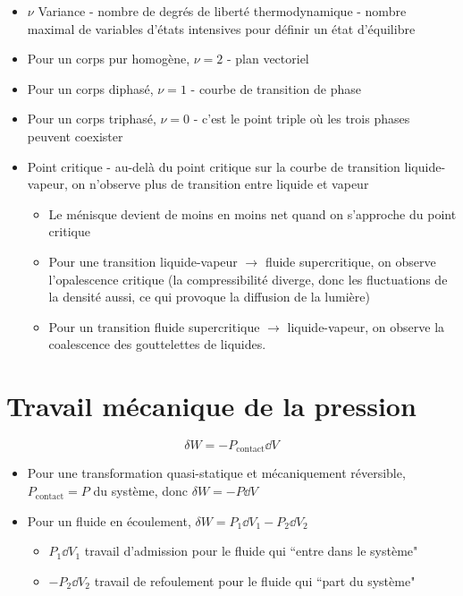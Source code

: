 \documentclass[openany]{book}
\begin{document}
\begin{itemize}
    \item $\nu$ Variance - nombre de degrés de liberté thermodynamique - nombre maximal de variables d'états intensives pour définir un état d'équilibre
    \item Pour un corps pur homogène, $\nu = 2$ - plan vectoriel
    \item Pour un corps diphasé, $\nu = 1$ - courbe de transition de phase
    \item Pour un corps triphasé, $\nu = 0$ - c'est le point triple où les trois phases peuvent coexister
    \item Point critique - au-delà du point critique sur la courbe de transition liquide-vapeur, on n'observe plus de transition entre liquide et vapeur
    \begin{itemize}
        \item Le ménisque devient de moins en moins net quand on s'approche du point critique
        \item Pour une transition liquide-vapeur $\rightarrow$ fluide supercritique, on observe l'opalescence critique (la compressibilité diverge, donc les fluctuations de la densité aussi, ce qui provoque la diffusion de la lumière)
        \item Pour un transition fluide supercritique $\rightarrow$ liquide-vapeur, on observe la coalescence des gouttelettes de liquides.
    \end{itemize}
\end{itemize}

\section{Travail mécanique de la pression}
\[ \delta W = - P_{\text{contact}} \dd V \]

\begin{itemize}
    \item Pour une transformation quasi-statique et mécaniquement réversible, $P_{\text{contact}} = P$ du système, donc $ \delta W = - P \dd V $
    \item Pour un fluide en écoulement, $\delta W = P_1 \dd V_1 - P_2 \dd V_2$ 
    \begin{itemize}
        \item $P_1 \dd V_1$ travail d'admission pour le fluide qui ``entre dans le système"
        \item $ - P_2 \dd V_2$ travail de refoulement pour le fluide qui ``part du système" 
    \end{itemize}
\end{itemize}
\end{document}
